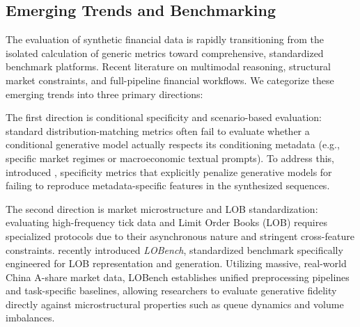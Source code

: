 \subsection{Emerging Trends and Benchmarking}

The evaluation of synthetic financial data is rapidly transitioning from the isolated calculation of generic metrics toward comprehensive, standardized benchmark platforms. Recent literature on multimodal reasoning, structural market constraints, and full-pipeline financial workflows. We categorize these emerging trends into three primary directions:

The first direction is conditional specificity and scenario-based evaluation: standard distribution-matching metrics often fail to evaluate whether a conditional generative model actually respects its conditioning metadata (e.g., specific market regimes or macroeconomic textual prompts). To address this, \citep{narasimhan2024timeweaver} introduced \textit{}, specificity metrics that explicitly penalize generative models for failing to reproduce metadata-specific features in the synthesized sequences.

The second direction is market microstructure and LOB standardization: evaluating high-frequency tick data and Limit Order Books (LOB) requires specialized protocols due to their asynchronous nature and stringent cross-feature constraints. \citep{lobench2025} recently introduced \textit{LOBench}, standardized benchmark specifically engineered for LOB representation and generation. Utilizing massive, real-world China A-share market data, LOBench establishes unified preprocessing pipelines and task-specific baselines, allowing researchers to evaluate generative fidelity directly against microstructural properties such as queue dynamics and volume imbalances.

